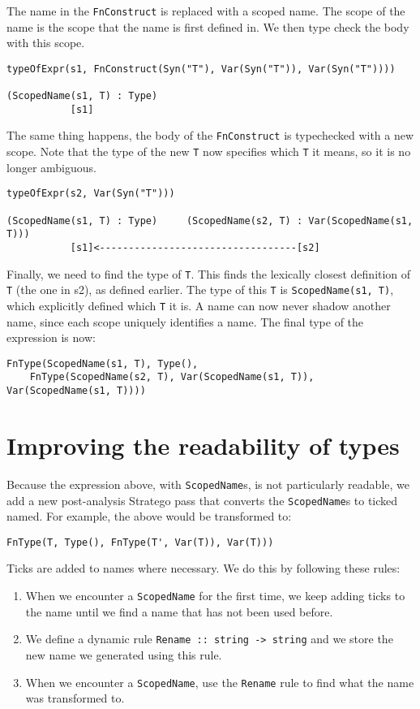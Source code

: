 \noindent
The name in the \verb|FnConstruct| is replaced with a scoped name. The scope of the name is the scope that the name is first defined in. We then type check the body with this scope.

\begin{lstlisting}
typeOfExpr(s1, FnConstruct(Syn("T"), Var(Syn("T")), Var(Syn("T"))))

(ScopedName(s1, T) : Type)
	       [s1]
\end{lstlisting}

\noindent
The same thing happens, the body of the \verb|FnConstruct| is typechecked with a new scope. Note that the type of the new \verb|T| now specifies which \verb|T| it means, so it is no longer ambiguous.

\begin{lstlisting}
typeOfExpr(s2, Var(Syn("T")))

(ScopedName(s1, T) : Type)     (ScopedName(s2, T) : Var(ScopedName(s1, T)))
	       [s1]<----------------------------------[s2]
\end{lstlisting}

Finally, we need to find the type of \verb|T|. This finds the lexically closest definition of \verb|T| (the one in s2), as defined earlier. The type of this \verb|T| is \verb|ScopedName(s1, T)|, which explicitly defined which \verb|T| it is. A name can now never shadow another name, since each scope uniquely identifies a name. The final type of the expression is now:

\begin{lstlisting}
FnType(ScopedName(s1, T), Type(),
	FnType(ScopedName(s2, T), Var(ScopedName(s1, T)), Var(ScopedName(s1, T))))
\end{lstlisting}

\section{Improving the readability of types}

Because the expression above, with \verb|ScopedName|s, is not particularly readable, we add a new post-analysis Stratego pass that converts the \verb|ScopedName|s to ticked named. For example, the above would be transformed to:

\begin{lstlisting}
FnType(T, Type(), FnType(T', Var(T)), Var(T)))
\end{lstlisting}
Ticks are added to names where necessary. We do this by following these rules:

\begin{enumerate}
	\item When we encounter a \verb|ScopedName| for the first time, we keep adding ticks to the name until we find a name that has not been used before. 
	\item We define a dynamic rule \verb|Rename :: string -> string| and we store the new name we generated using this rule.
	\item When we encounter a \verb|ScopedName|, use the \verb|Rename| rule to find what the name was transformed to.
\end{enumerate}

